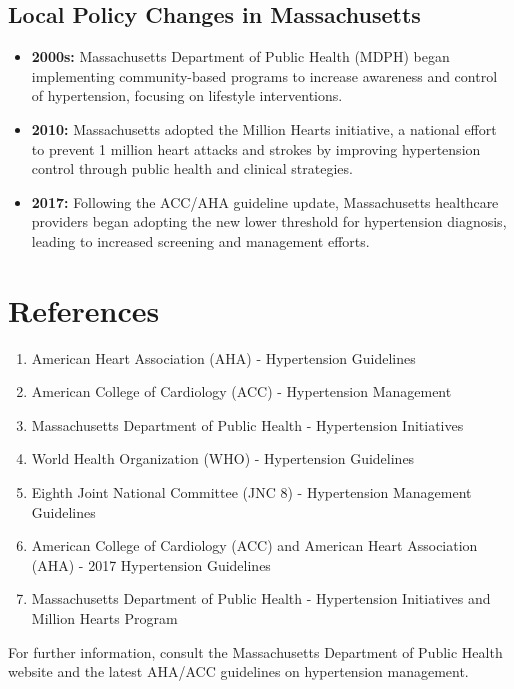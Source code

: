 \documentclass{article}
\begin{document}
\subsection{Local Policy Changes in Massachusetts}
\begin{itemize}
    \item \textbf{2000s:} Massachusetts Department of Public Health (MDPH) began implementing community-based programs to increase awareness and control of hypertension, focusing on lifestyle interventions.
    \item \textbf{2010:} Massachusetts adopted the Million Hearts initiative, a national effort to prevent 1 million heart attacks and strokes by improving hypertension control through public health and clinical strategies.
    \item \textbf{2017:} Following the ACC/AHA guideline update, Massachusetts healthcare providers began adopting the new lower threshold for hypertension diagnosis, leading to increased screening and management efforts.
\end{itemize}

\section{References}
\begin{enumerate}
    \item American Heart Association (AHA) - Hypertension Guidelines
    \item American College of Cardiology (ACC) - Hypertension Management
    \item Massachusetts Department of Public Health - Hypertension Initiatives
    \item World Health Organization (WHO) - Hypertension Guidelines
    \item Eighth Joint National Committee (JNC 8) - Hypertension Management Guidelines
    \item American College of Cardiology (ACC) and American Heart Association (AHA) - 2017 Hypertension Guidelines
    \item Massachusetts Department of Public Health - Hypertension Initiatives and Million Hearts Program
\end{enumerate}

For further information, consult the Massachusetts Department of Public Health website and the latest AHA/ACC guidelines on hypertension management.
\end{document}
